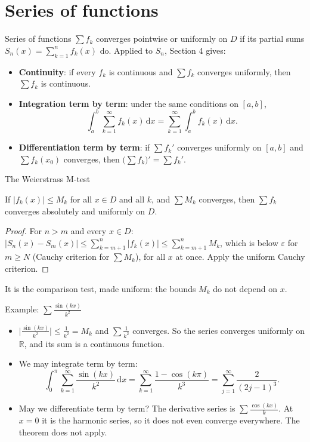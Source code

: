 \documentclass[10pt]{wosm-slides}
\newcommand{\R}{\mathbb{R}}
\newcommand{\dx}{\,\mathrm{d}x}
\begin{document}
\section{Series of functions}

\begin{frame}{Series of functions}
  $\sum f_k$ converges pointwise or uniformly on $D$ if its partial sums
  $S_n(x) = \sum_{k=1}^n f_k(x)$ do. Applied to $S_n$, Section 4 gives:
  \begin{itemize}
    \item \textbf{Continuity}: if every $f_k$ is continuous and $\sum f_k$ converges uniformly,
      then $\sum f_k$ is continuous.
    \item \textbf{Integration term by term}: under the same conditions on $[a, b]$,
      \[ \int_a^b \sum_{k=1}^\infty f_k(x)\dx = \sum_{k=1}^\infty \int_a^b f_k(x)\dx . \]
    \item \textbf{Differentiation term by term}: if $\sum f_k'$ converges uniformly on
      $[a, b]$ and $\sum f_k(x_0)$ converges, then
      $\bigl(\sum f_k\bigr)' = \sum f_k'$.
  \end{itemize}
\end{frame}

\begin{frame}{The Weierstrass M-test}
  \begin{theorem}
    If $|f_k(x)| \le M_k$ for all $x \in D$ and all $k$, and $\sum M_k$ converges, then
    $\sum f_k$ converges absolutely and uniformly on $D$.
  \end{theorem}
  \pause
  \begin{proof}
    For $n > m$ and every $x \in D$:
    $|S_n(x) - S_m(x)| \le \sum_{k=m+1}^{n} |f_k(x)| \le \sum_{k=m+1}^{n} M_k$,
    which is below $\varepsilon$ for $m \ge N$ (Cauchy criterion for $\sum M_k$), for all $x$
    at once. Apply the uniform Cauchy criterion.
  \end{proof}
  It is the comparison test, made uniform: the bounds $M_k$ do not depend on $x$.
\end{frame}

\begin{frame}{Example: $\sum \frac{\sin(kx)}{k^2}$}
  \begin{itemize}
    \item $\bigl|\frac{\sin(kx)}{k^2}\bigr| \le \frac{1}{k^2} = M_k$ and $\sum \frac{1}{k^2}$
      converges. So the series converges uniformly on $\R$, and its sum is a continuous function.
    \item We may integrate term by term:
      \[ \int_0^\pi \sum_{k=1}^\infty \frac{\sin(kx)}{k^2}\dx
         = \sum_{k=1}^\infty \frac{1 - \cos(k\pi)}{k^3}
         = \sum_{j=1}^\infty \frac{2}{(2j-1)^3} . \]
    \item May we differentiate term by term? The derivative series is
      $\sum \frac{\cos(kx)}{k}$. At $x = 0$ it is the harmonic series, so it does not even
      converge everywhere. The theorem does not apply.
  \end{itemize}
\end{frame}
\end{document}

